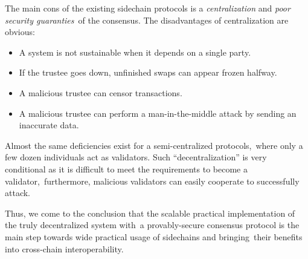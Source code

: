 The main cons of the existing sidechain protocols is a \emph{centralization} and \emph{poor security guaranties}\
of the consensus.
The disadvantages of centralization are obvious:
\begin{itemize}
    \item A system is not sustainable when it depends on a single party.
    \item If the trustee goes down, unfinished swaps can appear frozen halfway.
    \item A malicious trustee can censor transactions.
    \item A malicious trustee can perform a man-in-the-middle attack by sending an inaccurate data.
\end{itemize}
Almost the same deficiencies exist for a semi-centralized protocols,\
where only a few dozen individuals act as validators.
Such \enquote{decentralization} is very conditional as it is difficult to meet the requirements to become a validator,\
furthermore, malicious validators can easily cooperate to successfully attack.

Thus, we come to the conclusion that the scalable practical implementation of the truly decentralized system with\
a provably-secure consensus protocol is the main step towards wide practical usage of sidechains and bringing\
their benefits into cross-chain interoperability.
